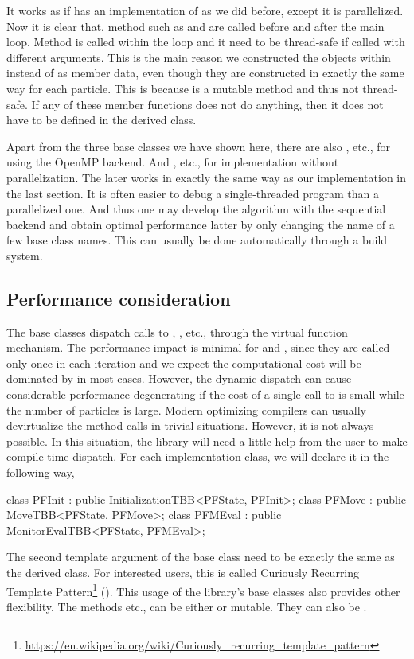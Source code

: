 It works as if  has an implementation of
 as we did before, except it is parallelized. Now it is
clear that, method such as  and  are
called before and after the main loop. Method  is called
within the loop and it need to be thread-safe if called with different
arguments. This is the main reason we constructed the
 objects within  instead of as
member data, even though they are constructed in exactly the same way for each
particle. This is because  is a
mutable method and thus not thread-safe. If any of these member functions does
not do anything, then it does not have to be defined in the derived class.

Apart from the three base classes we have shown here, there are also
, etc., for using the OpenMP backend. And
, etc., for implementation without
parallelization. The later works in exactly the same way as our implementation
in the last section. It is often easier to debug a single-threaded program than
a parallelized one. And thus one may develop the algorithm with the sequential
backend and obtain optimal performance latter by only changing the name of a
few base class names. This can usually be done automatically through a build
system.

\subsection{Performance consideration}
\label{sec:Performance consideration}

The base classes dispatch calls to , ,
etc., through the virtual function mechanism. The performance impact is minimal
for  and , since they are called only
once in each iteration and we expect the computational cost will be dominated
by  in most cases. However, the dynamic dispatch can cause
considerable performance degenerating if the cost of a single call to
 is small while the number of particles is large. Modern
optimizing compilers can usually devirtualize the method calls in trivial
situations. However, it is not always possible. In this situation, the library
will need a little help from the user to make compile-time dispatch. For each
implementation class, we will declare it in the following way,
\begin{cppcode}
  class PFInit : public InitializationTBB<PFState, PFInit>;
  class PFMove : public MoveTBB<PFState, PFMove>;
  class PFMEval : public MonitorEvalTBB<PFState, PFMEval>;
\end{cppcode}
The second template argument of the base class need to be exactly the same as
the derived class. For interested users, this is called Curiously Recurring
Template
Pattern\footnote{\url{https://en.wikipedia.org/wiki/Curiously_recurring_template_pattern}}
(\crtp). This usage of the library's base classes also provides other
flexibility. The methods  etc., can be either
 or mutable. They can also be .
